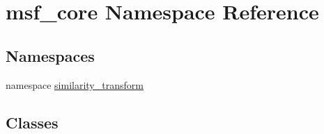 \hypertarget{namespacemsf__core}{\section{msf\-\_\-core Namespace Reference}
\label{namespacemsf__core}
}
\subsection*{Namespaces}
\begin{DoxyCompactItemize}
\item 
namespace \hyperlink{namespacemsf__core_1_1similarity__transform}{similarity\-\_\-transform}
\end{DoxyCompactItemize}
\subsection*{Classes}
